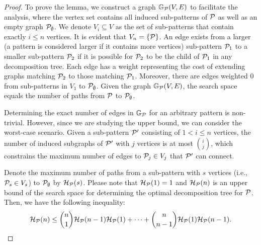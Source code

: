 \begin{proof}
    To prove the lemma, we construct a graph $\mathbb{G}_{\mathcal{P}}(V, E)$ to facilitate the analysis, where the vertex set contains all induced sub-patterns of $\mathcal{P}$ as well as an empty graph $\mathcal{P}_{\emptyset}$.
    We denote $V_i \subseteq V$ as the set of sub-patterns that contain exactly $i \leq n$ vertices. It is evident that $V_n = \{\mathcal{P}\}$.
    An edge exists from a larger (a pattern is considered larger if it contains more vertices) sub-pattern $\mathcal{P}_1$ to a smaller sub-pattern $\mathcal{P}_2$ if it is possible for $\mathcal{P}_2$ to be the child of $\mathcal{P}_1$ in any decomposition tree. Each edge has a weight representing the cost of extending graphs matching $\mathcal{P}_2$ to those matching $\mathcal{P}_1$.
    Moreover, there are edges weighted 0 from sub-patterns in $V_1$ to $\mathcal{P}_{\emptyset}$.
    Given the graph $\mathbb{G}_{\mathcal{P}}(V, E)$, %
    the search space equals the number of paths from $\mathcal{P}$ to $\mathcal{P}_{\emptyset}$.

    Determining the exact number of edges in $\mathbb{G}_{\mathcal{P}}$ for an arbitrary pattern is non-trivial. However, since we are studying the upper bound, we can consider the worst-case scenario. Given a sub-pattern $\mathcal{P}'$ consisting of $1 < i \leq n$ vertices, the number of induced subgraphs of $\mathcal{P}'$ with $j$ vertices is at most $\binom{i}{j}$, which constrains the maximum number of edges to $\mathcal{P}_j \in V_j$ that $\mathcal{P}'$ can connect.

    Denote the maximum number of paths from a sub-pattern with $s$ vertices (i.e., $\mathcal{P}_s \in V_s$) to $\mathcal{P}_{\emptyset}$ by $\mathcal{H}_{\mathcal{P}}(s)$.
    Please note that $\mathcal{H}_{\mathcal{P}}(1) = 1$ and $\mathcal{H}_{\mathcal{P}}(n)$ is an upper bound of the search space for determining the optimal decomposition tree for $\mathcal{P}$.
    Then, we have the following inequality:
    \begin{equation*}
        \mathcal{H}_{\mathcal{P}}(n) \leq \binom{n}{1}\mathcal{H}_{\mathcal{P}}(n-1)\mathcal{H}_{\mathcal{P}}(1) + \cdots + \binom{n}{n-1}\mathcal{H}_{\mathcal{P}}(1)\mathcal{H}_{\mathcal{P}}(n-1).
    \end{equation*}


\end{proof}
